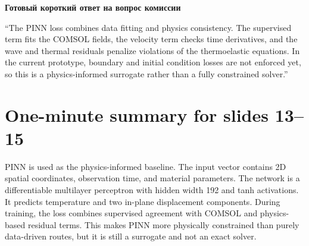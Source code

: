 \documentclass[11pt]{article}
\newcommand{\slide}[1]{\section*{\textcolor{TitleBlue}{#1}}}
\newcommand{\minihead}[1]{\vspace{3pt}\textbf{\textcolor{TitleBlue}{#1}}\par}
\begin{document}
\minihead{Готовый короткий ответ на вопрос комиссии}
``The PINN loss combines data fitting and physics consistency. The supervised term fits the COMSOL fields, the velocity term checks time derivatives, and the wave and thermal residuals penalize violations of the thermoelastic equations. In the current prototype, boundary and initial condition losses are not enforced yet, so this is a physics-informed surrogate rather than a fully constrained solver.''

\slide{One-minute summary for slides 13--15}

PINN is used as the physics-informed baseline. The input vector contains 2D spatial coordinates, observation time, and material parameters. The network is a differentiable multilayer perceptron with hidden width 192 and tanh activations. It predicts temperature and two in-plane displacement components. During training, the loss combines supervised agreement with COMSOL and physics-based residual terms. This makes PINN more physically constrained than purely data-driven routes, but it is still a surrogate and not an exact solver.
\end{document}
